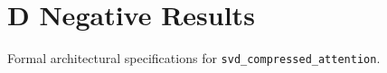 \section{D Negative Results}

Formal architectural specifications for \texttt{svd_compressed_attention}.
